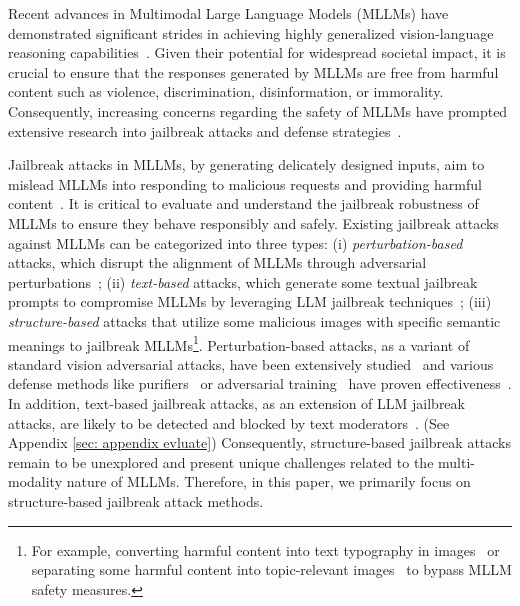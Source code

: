 Recent advances in Multimodal Large Language Models (MLLMs) have demonstrated significant strides in achieving highly generalized vision-language reasoning capabilities~\cite{bai2023qwenvl,openai2023gpt4,liu2024llavanext,chen2023internvl,yang2023setofmark,yin2023survey,fu2023mme,yin2023woodpecker,reid2024gemini,li2023blip2,lin2023video,zhu2023languagebind,zhang2023llamaadapter,gu2024agent,achiam2023gpt,lyu2023gpt,liu2024multimodal,zhang2024mmllms,liu2024multimodal,dong2024internlmxcomposer2,yu2023rlhf}. Given their potential for widespread societal impact, it is crucial to ensure that the responses generated by MLLMs are free from harmful content such as violence, discrimination, disinformation, or immorality\cite{OpenAI_UsagePolicies, meta_ai_2024_llama}. Consequently, increasing concerns regarding the safety of MLLMs have prompted extensive research into jailbreak attacks and defense strategies~\cite{wang2024adashield,zong2023safety,yu2023rlhf,2023vlfeedback,cha2024visually,2023llavarlhf,liu2024survey,ji2023large,rizwan2024zero,shayegani2023survey}.

Jailbreak attacks in MLLMs, by generating delicately designed inputs, aim to mislead MLLMs into responding to malicious requests and providing harmful content~\cite{gong2023figstep,liu2024mmsafetybench,luo2024jailbreakv28k,wei2023skywork,dong2024internlmxcomposer2,shayegani2024jailbreak,han2023otattack,qi2023visual,schlarmann2023adversarial,zhang2023mutation,wang2024decodingtrust,li2024red,naveed2024comprehensive,liu2024agentbench}. It is critical to evaluate and understand the jailbreak robustness of MLLMs to ensure they behave responsibly and safely. Existing jailbreak attacks against MLLMs can be categorized into three types: (i) \textit{perturbation-based} attacks, which disrupt the alignment of MLLMs through adversarial perturbations~\cite{niu2024jailbreaking, qi2023visual, dong2023robust}; (ii) \textit{text-based} attacks, which generate some textual jailbreak prompts to compromise MLLMs by leveraging LLM jailbreak techniques~\cite{luo2024jailbreakv28k}; (iii) \textit{structure-based} attacks that utilize some malicious images with specific semantic meanings to jailbreak MLLMs\footnote{For example, converting harmful content into text typography in images~\cite{gong2023figstep} or separating some harmful content into topic-relevant images~\cite{liu2024mmsafetybench} to bypass MLLM safety measures.}. Perturbation-based attacks, as a variant of standard vision adversarial attacks, have been extensively studied~\cite{chen2023dress} and various defense methods like purifiers~\cite{Mao2021ICCV,guo2024puridefense, nie2022diffusion} or adversarial training~\cite{advtraining} have proven effectiveness~\cite{shayegani2023survey}. In addition, text-based jailbreak attacks, as an extension of LLM jailbreak attacks, are likely to be detected and blocked by text moderators~\cite{inan2023llamaguard}. (See Appendix \ref{sec: appendix evluate}) Consequently, structure-based jailbreak attacks remain to be unexplored and present unique challenges related to the multi-modality nature of MLLMs. Therefore, in this paper, we primarily focus on structure-based jailbreak attack methods.

